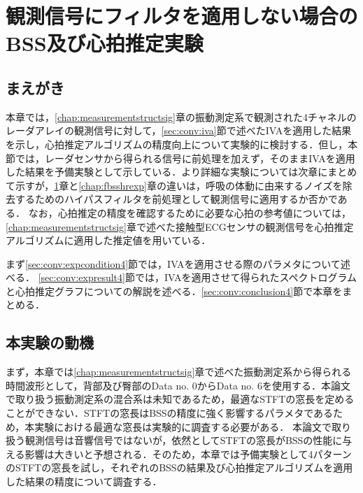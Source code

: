 \chapter{観測信号にフィルタを適用しない場合のBSS及び心拍推定実験}
\label{chap:bsshrexp}

\section{まえがき}
本章では，\ref{chap:measurementstructsig}章の振動測定系で観測された4チャネルのレーダアレイの観測信号に対して，\ref{sec:conv:iva}節で述べたIVAを適用した結果を示し，心拍推定アルゴリズムの精度向上について実験的に検討する．但し，本節では，レーダセンサから得られる信号に前処理を加えず，そのままIVAを適用した結果を予備実験として示している．より詳細な実験については次章にまとめて示すが，\ref{chap:bsshrexp}章と\ref{chap:fbsshrexp}章の違いは，呼吸の体動に由来するノイズを除去するためのハイパスフィルタを前処理として観測信号に適用するか否かである．
なお，心拍推定の精度を確認するために必要な心拍の参考値については，\ref{chap:measurementstructsig}章で述べた接触型ECGセンサの観測信号を心拍推定アルゴリズムに適用した推定値を用いている．

まず\ref{sec:conv:expcondition4}節では，IVAを適用させる際のパラメタについて述べる．
\ref{sec:conv:expresult4}節では，IVAを適用させて得られたスペクトログラムと心拍推定グラフについての解説を述べる．\ref{sec:conv:conclusion4}節で本章をまとめる．

\section{本実験の動機}
\label{sec:conv:expmotivation}
まず，本章では\ref{chap:measurementstructsig}章で述べた振動測定系から得られる時間波形として，背部及び臀部のData no. 0からData no. 6を使用する．本論文で取り扱う振動測定系の混合系は未知であるため，最適なSTFTの窓長を定めることができない．STFTの窓長はBSSの精度に強く影響するパラメタである\cite{winlengthBSS}ため，本実験における最適な窓長は実験的に調査する必要がある．
本論文で取り扱う観測信号は音響信号ではないが，依然としてSTFTの窓長がBSSの性能に与える影響は大きいと予想される．そのため，本章では予備実験として4パターンのSTFTの窓長を試し，それぞれのBSSの結果及び心拍推定アルゴリズムを適用した結果の精度について調査する．

